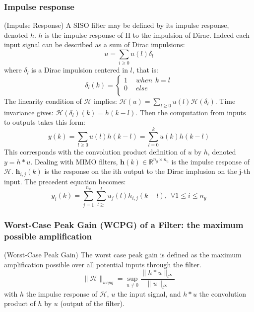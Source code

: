 	\subsubsection{Impulse response}
	\begin{thdef} (Impulse Response)
	A SISO filter may be defined by its impulse response, denoted $h$. $h$ is the
	impulse response of H to the impulsion of Dirac.
	Indeed each input signal can be described as a sum of Dirac impulsions:
	$$u=\sum_{i\geq0}u(l)\delta_l$$
	where $\delta_l$ is a Dirac impulsion centered in $l$, that is:
	\begin{equation}
		\delta_l(k) =
		\begin{cases}
			1 & \hspace{5pt} when \hspace{5pt} k=l\\
			0 & \hspace{5pt} else\\
		\end{cases}
	\end{equation}
	The linearity condition of $\mathcal{H}$ implies: $\mathcal{H}(u) = \sum_{l\geq0}u(l)\mathcal{H}(\delta_l)$.
	Time invariance gives: $\mathcal{H}(\delta_l)(k)=h(k-l)$.
	Then the computation from inputs to outputs takes this form:
	$$y(k)=\sum_{l\geq0}u(l)h(k-l)=\sum_{l=0}^ku(k)h(k-l)$$
	This corresponds with the convolution product definition of $u$ by $h$, denoted $y = h * u$.
	Dealing with MIMO filters, $\boldsymbol{h}(k) \in \mathbb{R}^{n_y \times n_u}$ is the impulse response of $\mathcal{H}$. $\boldsymbol{h}_{i,j}(k)$ is the response on the
	ith output to the Dirac implusion on the j-th input.
	The precedent equation becomes:
	$$y_i(k)=\sum_{j=1}^{n_u}\sum_{l\geq}^lu_j(l)h_{i,j}(k-l), \hspace{5pt} \forall 1 \leq i \leq n_y$$
	
	\end{thdef} 

	\subsubsection{Worst-Case Peak Gain (WCPG) of a Filter: the maximum possible amplification}
	\begin{thdef} (Worst-Case Peak Gain)
		The worst case peak gain is defined as the maximum amplification
		possible over all potential inputs through the filter.
		$$\|\mathcal{H}\|_{wcpg}=\sup_{u\neq0}\frac{\|h*u\|_{l^{\infty}}}{\|u\|_{l^{\infty}}}$$
		with $h$ the impulse response of $\mathcal{H}$, $u$ the input signal, and $h * u$ the convolution product of $h$ by $u$ (output of the
				filter).
	
	\end{thdef}

